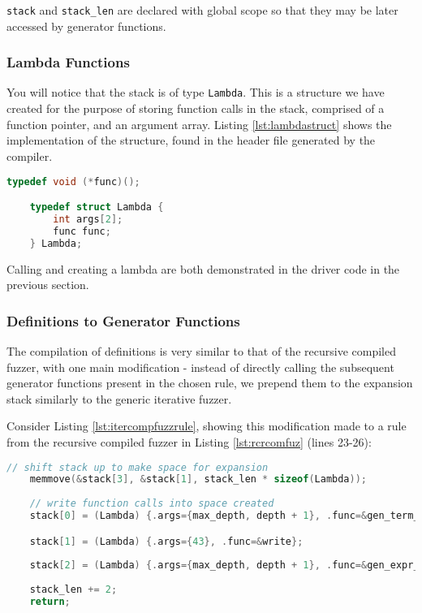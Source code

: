 \documentclass[8pt, twoside]{extarticle}
\begin{document}
\verb|stack| and \verb|stack_len| are declared with global scope so that they may be later accessed by generator functions. 

\subsubsection{Lambda Functions}

You will notice that the stack is of type \verb|Lambda|. This is a structure we have created for the purpose of storing function calls in the stack, comprised of a function pointer, and an argument array. Listing \ref{lst:lambdastruct} shows the implementation of the structure, found in the header file generated by the compiler.

\begin{lstlisting}[gobble=2, language=C, caption={C Lambda Structure}, label=lst:lambdastruct]
	typedef void (*func)();

	typedef struct Lambda {
		int args[2];
		func func;
	} Lambda;
\end{lstlisting}

Calling and creating a lambda are both demonstrated in the driver code in the previous section.

\subsubsection{Definitions to Generator Functions}

The compilation of definitions is very similar to that of the recursive compiled fuzzer, with one main modification - instead of directly calling the subsequent generator functions present in the chosen rule, we prepend them to the expansion stack similarly to the generic iterative fuzzer. 

Consider Listing \ref{lst:itercompfuzzrule}, showing this modification made to a rule from the recursive compiled fuzzer in Listing \ref{lst:rcrcomfuz} (lines 23-26):

\begin{lstlisting}[gobble=2, language=C, caption={Iterative compiled fuzzer rule}, label=lst:itercompfuzzrule]
	// shift stack up to make space for expansion
	memmove(&stack[3], &stack[1], stack_len * sizeof(Lambda));
	
	// write function calls into space created
	stack[0] = (Lambda) {.args={max_depth, depth + 1}, .func=&gen_term_rand};

	stack[1] = (Lambda) {.args={43}, .func=&write};
	
	stack[2] = (Lambda) {.args={max_depth, depth + 1}, .func=&gen_expr_rand};
	
	stack_len += 2;
	return;
\end{lstlisting} 
\end{document}

